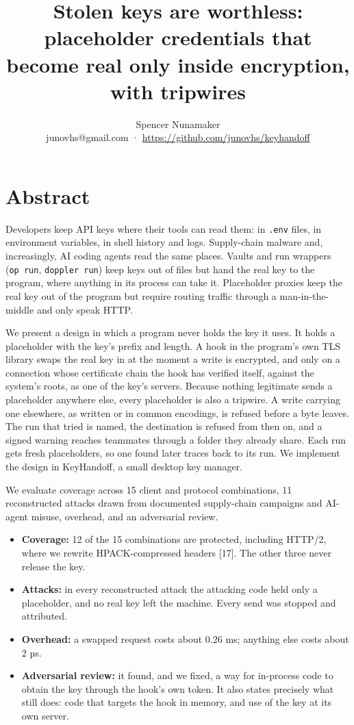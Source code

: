 \documentclass[
  11pt]{article}
\title{Stolen keys are worthless:
placeholder credentials that become real
only inside encryption, with tripwires}
\author{Spencer Nunamaker\\
{junovhs@gmail.com ·
\url{https://github.com/junovhs/keyhandoff}}}
\date{}
\providecommand{\tightlist}{%
  \setlength{\itemsep}{0pt}\setlength{\parskip}{0pt}}
\begin{document}
\maketitle

\section*{Abstract}\label{abstract}

Developers keep API keys where their
tools can read them: in \texttt{.env}
files, in environment variables, in
shell history and logs. Supply-chain
malware and, increasingly, AI coding
agents read the same places. Vaults and
run wrappers (\texttt{op\ run},
\texttt{doppler\ run}) keep keys out of
files but hand the real key to the
program, where anything in its process
can take it. Placeholder proxies keep
the real key out of the program but
require routing traffic through a
man-in-the-middle and only speak HTTP.

We present a design in which a program
never holds the key it uses. It holds a
placeholder with the key's prefix and
length. A hook in the program's own TLS
library swaps the real key in at the
moment a write is encrypted, and only on
a connection whose certificate chain the
hook has verified itself, against the
system's roots, as one of the key's
servers. Because nothing legitimate
sends a placeholder anywhere else, every
placeholder is also a tripwire. A write
carrying one elsewhere, as written or in
common encodings, is refused before a
byte leaves. The run that tried is
named, the destination is refused from
then on, and a signed warning reaches
teammates through a folder they already
share. Each run gets fresh placeholders,
so one found later traces back to its
run. We implement the design in
KeyHandoff, a small desktop key manager.

We evaluate coverage across 15 client
and protocol combinations, 11
reconstructed attacks drawn from
documented supply-chain campaigns and
AI-agent misuse, overhead, and an
adversarial review.

\begin{itemize}
\tightlist
\item
  \textbf{Coverage:} 12 of the 15
  combinations are protected, including
  HTTP/2, where we rewrite
  HPACK-compressed headers {[}17{]}. The
  other three never release the key.
\item
  \textbf{Attacks:} in every
  reconstructed attack the attacking
  code held only a placeholder, and no
  real key left the machine. Every send
  was stopped and attributed.
\item
  \textbf{Overhead:} a swapped request
  costs about 0.26 ms; anything else
  costs about 2 µs.
\item
  \textbf{Adversarial review:} it found,
  and we fixed, a way for in-process
  code to obtain the key through the
  hook's own token. It also states
  precisely what still does: code that
  targets the hook in memory, and use of
  the key at its own server.
\end{itemize}
\end{document}
